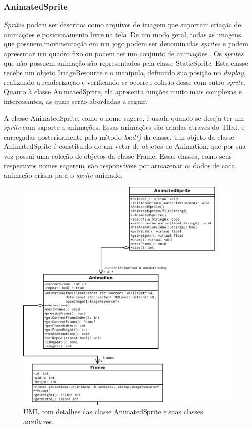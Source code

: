 \subsubsection{AnimatedSprite}
%
%
\textit{Sprites} podem ser descritos como arquivos de imagem que suportam criação de animações e posicionamento livre na tela. De um modo geral, todas as imagens que possuem movimentação em um jogo podem ser denominadas \textit{sprites} e podem apresentar um quadro fixo ou podem ter um conjunto de animações \cite{Novatec}. Os \textit{sprites} que não possuem animação são representados pela classe StaticSprite. Esta classe recebe um objeto ImageResource e o manipula, definindo sua posição no \textit{display}, realizando a renderização e verificando se ocorreu colisão desse com outro \textit{sprite}. Quanto à classe AnimatedSprite, ela apresenta funções muito mais complexas e interessantes, as quais serão abordadas a seguir.
\par 
A classe AnimatedSprite, como o nome sugere, é usada quando se deseja ter um \textit{sprite} com suporte a animações. Essas animações são criadas através do Tiled, e carregadas posteriormente pelo método \textit{load()} da classe. Um objeto da classe AnimatedSprite é constituído de um vetor de objetos do Animation, que por sua vez possui uma coleção de objetos da classe Frame. Essas classes, como seus respectivos nomes sugerem, são responsáveis por armazenar os dados de cada animação criada para o \textit{sprite} animado.
%
%
%
\begin{figure}[H]
    \centering
		\caption{UML com detalhes das classe AnimatedSprite e suas classes auxiliares.}
    \label{AnimatedSprite}
    \includegraphics[scale = 0.40]{uml/AnimatedSprite.png}
\end{figure}
